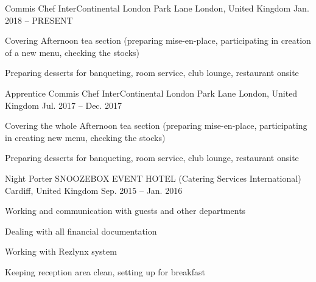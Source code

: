 

\begin{cventries}

  \cventry
    {Commis Chef} %
    {InterContinental London Park Lane} %
    {London, United Kingdom} %
    {Jan. 2018 -- PRESENT} %
    {
      \begin{cvitems} %
        \item {Covering Afternoon tea section (preparing mise-en-place, participating in creation of a new menu, checking the stocks)}
        \item {Preparing desserts for banqueting, room service, club lounge, restaurant onsite}
      \end{cvitems}
    }

  \cventry
    {Apprentice Commis Chef} %
    {InterContinental London Park Lane} %
    {London, United Kingdom} %
    {Jul. 2017 -- Dec. 2017} %
    {
      \begin{cvitems} %
        \item {Covering the whole Afternoon tea section (preparing mise-en-place, participating in creating new menu, checking the stocks)}
        \item {Preparing desserts for banqueting, room service, club lounge, restaurant onsite}
      \end{cvitems}
    }

  \cventry
    {Night Porter} %
    {SNOOZEBOX EVENT HOTEL (Catering Services International)} %
    {Cardiff, United Kingdom} %
    {Sep. 2015 -- Jan. 2016} %
    {
      \begin{cvitems} %
        \item {Working and communication with guests and other departments}
        \item {Dealing with all financial documentation}
        \item {Working with Rezlynx system}
        \item {Keeping reception area clean, setting up for breakfast}
      \end{cvitems}
    }


\end{cventries}
